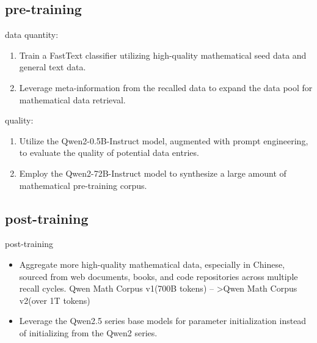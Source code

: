 \documentclass[aspectratio=169]{beamer}
\begin{document}
\subsection{pre-training}
\begin{frame}{data}
	quantity:
	\begin{enumerate}
		\item Train a FastText classifier utilizing high-quality mathematical seed data and general text data.
		      \pause
		\item Leverage meta-information from the recalled data to expand the data pool for mathematical data retrieval.
		      \pause
	\end{enumerate}
	quality:
	\begin{enumerate}
		\item Utilize the Qwen2-0.5B-Instruct model, augmented with prompt engineering, to evaluate the quality of potential data entries.
		      \pause
		\item Employ the Qwen2-72B-Instruct model to synthesize a large amount of mathematical pre-training corpus.
	\end{enumerate}
\end{frame}

\subsection{post-training}
\begin{frame}{post-training}
	\begin{itemize}
		\item Aggregate more high-quality mathematical data, especially in Chinese, sourced from web documents, books, and code repositories across multiple recall cycles. Qwen Math Corpus v1(700B tokens) -- >Qwen Math Corpus v2(over 1T tokens)\\[.2cm]
		      \pause
		\item Leverage the Qwen2.5 series base models for parameter initialization instead of initializing from the Qwen2 series.
	\end{itemize}


\end{frame}
\end{document}
